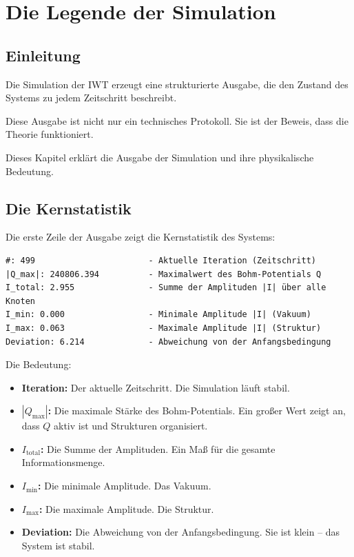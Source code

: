 \chapter{Die Legende der Simulation}

\section{Einleitung}

Die Simulation der IWT erzeugt eine strukturierte Ausgabe, die den Zustand des Systems zu jedem Zeitschritt beschreibt.

Diese Ausgabe ist nicht nur ein technisches Protokoll. Sie ist der Beweis, dass die Theorie funktioniert.

Dieses Kapitel erklärt die Ausgabe der Simulation und ihre physikalische Bedeutung.

\section{Die Kernstatistik}

Die erste Zeile der Ausgabe zeigt die Kernstatistik des Systems:

\begin{verbatim}
#: 499                       - Aktuelle Iteration (Zeitschritt)
|Q_max|: 240806.394          - Maximalwert des Bohm-Potentials Q
I_total: 2.955               - Summe der Amplituden |I| über alle Knoten
I_min: 0.000                 - Minimale Amplitude |I| (Vakuum)
I_max: 0.063                 - Maximale Amplitude |I| (Struktur)
Deviation: 6.214             - Abweichung von der Anfangsbedingung
\end{verbatim}

Die Bedeutung:

\begin{itemize}
\item \textbf{Iteration:} Der aktuelle Zeitschritt. Die Simulation läuft stabil.
\item \textbf{\( |Q_{\text{max}}| \):} Die maximale Stärke des Bohm-Potentials. Ein großer Wert zeigt an, dass \( Q \) aktiv ist und Strukturen organisiert.
\item \textbf{\( I_{\text{total}} \):} Die Summe der Amplituden. Ein Maß für die gesamte Informationsmenge.
\item \textbf{\( I_{\text{min}} \):} Die minimale Amplitude. Das Vakuum.
\item \textbf{\( I_{\text{max}} \):} Die maximale Amplitude. Die Struktur.
\item \textbf{Deviation:} Die Abweichung von der Anfangsbedingung. Sie ist klein – das System ist stabil.
\end{itemize}

